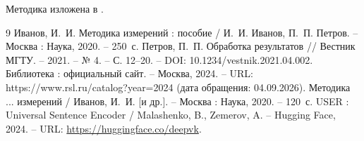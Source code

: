 Методика изложена в \cite{ivanov}.

\begin{thebibliography}{9}
   Иванов, И.~И. Методика измерений : пособие /
  И.~И. Иванов, П.~П. Петров. – Москва : Наука, 2020. – 250~с.
   Петров, П.~П. Обработка результатов // Вестник МГТУ. – 2021. –
  № 4. – С. 12--20. – DOI: 10.1234/vestnik.2021.04.002.
   Библиотека : официальный сайт. – Москва, 2024. –
  URL: https://www.rsl.ru/catalog?year=2024 (дата обращения: 04.09.2026).
   Методика ... измерений / Иванов, И.~И. [и др.]. –
  Москва : Наука, 2020. – 120~с.
   USER : Universal Sentence Encoder / Malashenko, B., Zemerov, A. –
  Hugging Face, 2024. – URL: \url{https://huggingface.co/deepvk}.
\end{thebibliography}
